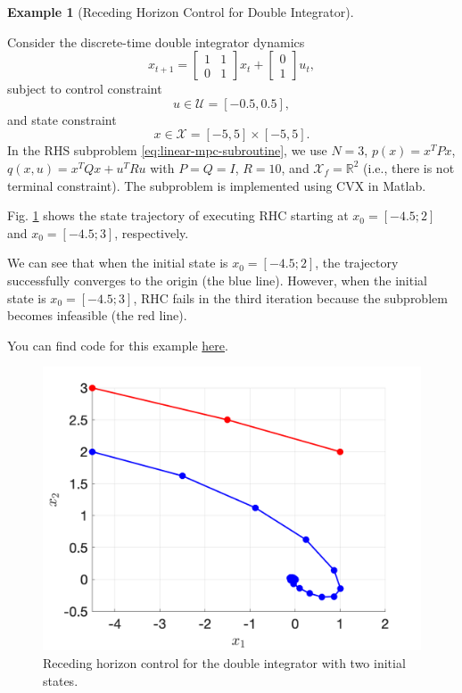 \documentclass[
]{book}
\theoremstyle{definition}
\theoremstyle{definition}
\newtheorem{example}{Example}[chapter]
\theoremstyle{definition}
\theoremstyle{definition}
\theoremstyle{remark}
\begin{document}
\begin{example}[Receding Horizon Control for Double Integrator]
\protect\hypertarget{exm:double-integrator-mpc}{}\label{exm:double-integrator-mpc}

Consider the discrete-time double integrator dynamics
\[
x_{t+1} = \begin{bmatrix} 1 & 1 \\ 0 & 1 \end{bmatrix} x_t + \begin{bmatrix} 0 \\ 1 \end{bmatrix} u_t,
\]
subject to control constraint
\[
u \in \mathcal{U} = [-0.5,0.5],
\]
and state constraint
\[
x \in \mathcal{X} = [-5, 5] \times [-5, 5].
\]
In the RHS subproblem \eqref{eq:linear-mpc-subroutine}, we use \(N = 3\), \(p(x) = x^T P x\), \(q(x,u) = x^T Q x + u^T R u\) with \(P = Q = I\), \(R=10\), and \(\mathcal{X}_f = \mathbb{R}^2\) (i.e., there is not terminal constraint). The subproblem is implemented using CVX in Matlab.

Fig. \ref{fig:double-integrator-mpc-two-initial-states} shows the state trajectory of executing RHC starting at \(x_0 = [-4.5;2]\) and \(x_0 = [-4.5;3]\), respectively.

We can see that when the initial state is \(x_0 = [-4.5;2]\), the trajectory successfully converges to the origin (the blue line). However, when the initial state is \(x_0 = [-4.5;3]\), RHC fails in the third iteration because the subproblem becomes infeasible (the red line).

You can find code for this example \href{https://github.com/ComputationalRobotics/OptimalControlEstimation-Examples/blob/main/double_integrator_mpc/double_integrator_mpc.m}{here}.

\begin{figure}

{\centering \includegraphics[width=0.7\linewidth]{images/double_integrator_mpc_two_initial_states} 

}

\caption{Receding horizon control for the double integrator with two initial states.}\label{fig:double-integrator-mpc-two-initial-states}
\end{figure}

\end{example}
\end{document}
